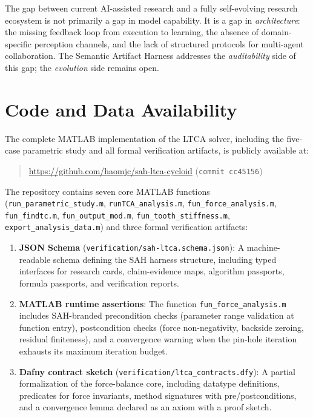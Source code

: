 \documentclass{article}
\newcommand{\revmark}{\marginpar{\footnotesize\textcolor{blue}{\textbf{Rev.\,2}}}}
\newcommand{\revmarkthree}{\marginpar{\footnotesize\textcolor{red}{\textbf{Rev.\,3}}}}
\begin{document}
The gap between current AI-assisted research and a fully self-evolving research ecosystem is not primarily a gap in model capability. It is a gap in \emph{architecture}: the missing feedback loop from execution to learning, the absence of domain-specific perception channels, and the lack of structured protocols for multi-agent collaboration. The Semantic Artifact Harness addresses the \emph{auditability} side of this gap; the \emph{evolution} side remains open.

\section*{Code and Data Availability}\revmark\revmarkthree

The complete MATLAB implementation of the LTCA solver, including the five-case parametric study and all formal verification artifacts, is publicly available at:
\begin{quote}
\url{https://github.com/haomjc/sah-ltca-cycloid} \quad (\texttt{commit cc45156})
\end{quote}

The repository contains seven core MATLAB functions (\texttt{run\_parametric\_study.m}, \texttt{runTCA\_analysis.m}, \texttt{fun\_force\_analysis.m}, \texttt{fun\_findtc.m}, \texttt{fun\_output\_mod.m}, \texttt{fun\_tooth\_stiffness.m}, \texttt{export\_analysis\_data.m}) and three formal verification artifacts:

\begin{enumerate}
    \item \textbf{JSON Schema} (\texttt{verification/sah-ltca.schema.json}): A machine-readable schema defining the SAH harness structure, including typed interfaces for research cards, claim-evidence maps, algorithm passports, formula passports, and verification reports.
    \item \textbf{MATLAB runtime assertions}: The function \texttt{fun\_force\_analysis.m} includes SAH-branded precondition checks (parameter range validation at function entry), postcondition checks (force non-negativity, backside zeroing, residual finiteness), and a convergence warning when the pin-hole iteration exhausts its maximum iteration budget.
    \item \textbf{Dafny contract sketch} (\texttt{verification/ltca\_contracts.dfy}): A partial formalization of the force-balance core, including datatype definitions, predicates for force invariants, method signatures with pre/postconditions, and a convergence lemma declared as an axiom with a proof sketch.
\end{enumerate}
\end{document}
